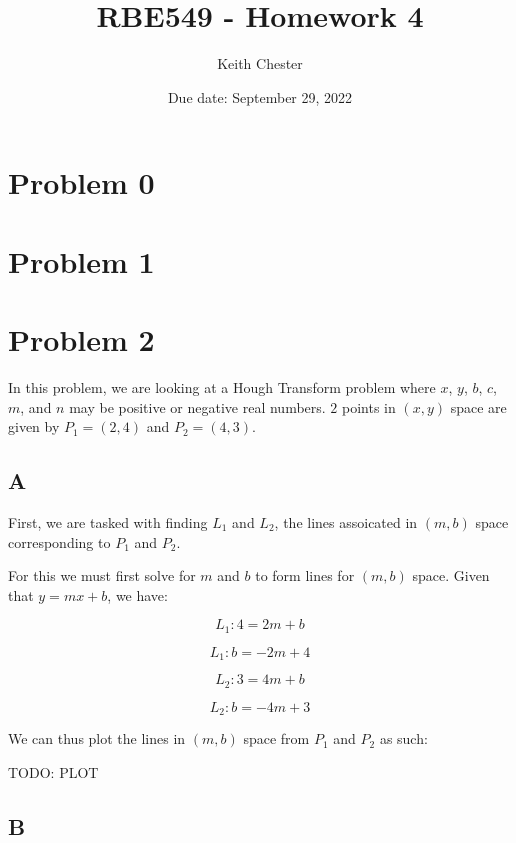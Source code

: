 \documentclass{article}
\title{RBE549 - Homework 4}
\author{Keith Chester}
\date{Due date: September 29, 2022}
\begin{document}
\maketitle

\section*{Problem 0}


\section*{Problem 1}


\section*{Problem 2}

In this problem, we are looking at a Hough Transform problem where $x$, $y$, $b$, $c$, $m$, and $n$ may be positive or negative real numbers. $2$ points in $(x,y)$ space are given by $P_1=(2,4)$ and $P_2=(4,3)$.

\subsection*{A}

First, we are tasked with finding $L_1$ and $L_2$, the lines assoicated in $(m,b)$ space corresponding to $P_1$ and $P_2$.

For this we must first solve for $m$ and $b$ to form lines for $(m,b)$ space. Given that $y = mx + b$, we have:

\begin{equation}
    L_1: 4 = 2m + b
\end{equation}

\begin{equation}
    L_1: b = -2m + 4
\end{equation}

\begin{equation}
    L_2: 3 = 4m + b
\end{equation}

\begin{equation}
    L_2: b = -4m + 3
\end{equation}

We can thus plot the lines in $(m,b)$ space from $P_1$ and $P_2$ as such:

TODO: PLOT

\subsection*{B}
\end{document}
